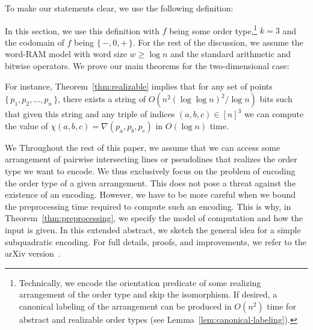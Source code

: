 \ifeurocg\else
To make our statements clear, we use the following definition:
%

%
In this section, we use this definition with \(f\) being some order
type,\footnote{%
  Technically, we encode the orientation predicate of some realizing
  arrangement of the order type and skip the isomorphism. If desired, a
  canonical labeling of the arrangement can be produced in \(O(n^2)\) time for
  abstract and realizable order types (see Lemma~\ref{lem:canonical-labeling}).
}
\(k=3\) and the codomain of \(f\) being \(\{\, -,0,+\,\}\). For the rest of the
discussion, we assume the word-RAM model with word size \(w \geq \log n\) and
the standard arithmetic and bitwise operators.
%
We prove our main theorems for the two-dimensional case:
%



%
For instance, Theorem~\ref{thm:realizable} implies that for any set of points
\(\{\, p_1, p_2, \ldots, p_n\,\}\), there exists a string of \(O(n^2 {(\log
\log n)}^2 / \log n)\) bits such that given this string and any triple of
indices \((a,b,c) \in {[n]}^3\) we can compute the value of \(\chi(a,b,c) =
\nabla(p_a, p_b, p_c)\) in \(O(\log n)\) time.
\fi

\ifeurocg
We \else
Throughout the rest of this paper, we \fi
assume that we can access some arrangement of pairwise intersecting lines or
pseudolines that realizes the order type we want to encode. We thus exclusively
focus on the problem of encoding the order type of a given arrangement. This
does not pose a threat against the existence of an encoding.
\ifeurocg\else%
However, we have to be more careful when we bound the preprocessing
time required to compute such an encoding. This is why, in
Theorem~\ref{thm:preprocessing}, we specify the model of computation and how
the input is given.
\fi%
\ifeurocg%
In this extended abstract, we sketch the general idea for a simple subquadratic
encoding. For full details, proofs, and improvements, we refer to the arXiv
version~\cite{CCILO18}.
\fi%

\ifjournal\else

\fi
